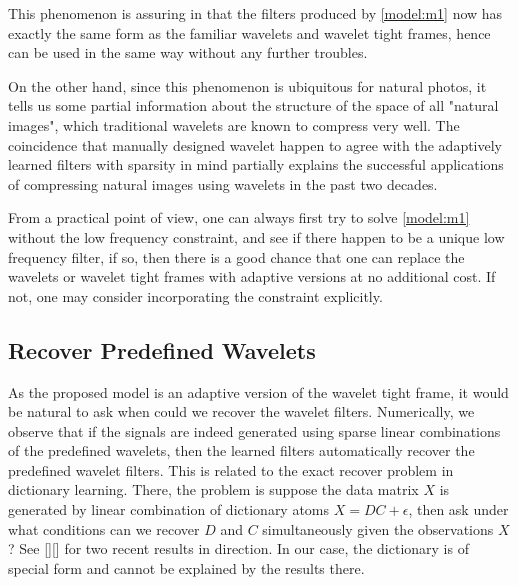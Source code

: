 \documentclass[a4paper]{article}
\begin{document}
This phenomenon is assuring in that the filters produced by \eqref{model:m1} now has exactly the same form as the familiar wavelets and wavelet tight frames, hence can be used in the same way without any further troubles. 

On the other hand, since this phenomenon is ubiquitous for natural photos, it tells us some partial information about the structure of the space of all "natural images", which traditional wavelets are known to compress very well. The coincidence that manually designed wavelet happen to agree with the adaptively learned filters with sparsity in mind partially explains the successful applications of compressing natural images using wavelets in the past two decades.

From a practical point of view, one can always first try to solve \eqref{model:m1} without the low frequency constraint, and see if there happen to be a unique low frequency filter, if so, then there is a good chance that one can replace the wavelets or wavelet tight frames with adaptive versions at no additional cost. If not, one may consider incorporating the constraint explicitly.

\subsection{Recover Predefined Wavelets}
As the proposed model is an adaptive version of the wavelet tight frame, it would be natural to ask when could we recover the wavelet filters. Numerically, we observe that if the signals are indeed generated using sparse linear combinations of the predefined wavelets, then the learned filters automatically recover the predefined wavelet filters. This is related to the exact recover problem in dictionary learning. There, the problem is suppose the data matrix $X$ is generated by linear combination of dictionary atoms $X=DC+\epsilon$, then ask under what conditions can we recover $D$ and $C$ simultaneously given the observations $X$? See [][] for two recent results in direction. In our case, the dictionary is of special form and cannot be explained by the results there.
\end{document}
